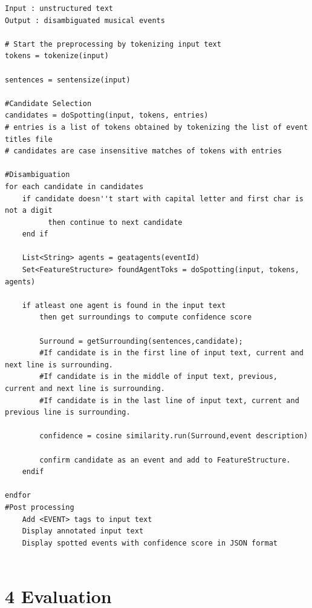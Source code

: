 \documentclass[a4paper,11pt]{report}
\begin{document}
\begin{lstlisting}[caption=This listing shows the pseudocode for EventSpotter.]
Input : unstructured text 
Output : disambiguated musical events

# Start the preprocessing by tokenizing input text
tokens = tokenize(input)

sentences = sentensize(input)

#Candidate Selection
candidates = doSpotting(input, tokens, entries)
# entries is a list of tokens obtained by tokenizing the list of event titles file
# candidates are case insensitive matches of tokens with entries

#Disambiguation
for each candidate in candidates
	if candidate doesn''t start with capital letter and first char is not a digit
          then continue to next candidate
	end if

    List<String> agents = geatagents(eventId)
	Set<FeatureStructure> foundAgentToks = doSpotting(input, tokens, agents)	
	
	if atleast one agent is found in the input text  
		then get surroundings to compute confidence score
			
		Surround = getSurrounding(sentences,candidate);
		#If candidate is in the first line of input text, current and next line is surrounding.
		#If candidate is in the middle of input text, previous, current and next line is surrounding.
		#If candidate is in the last line of input text, current and previous line is surrounding.
	
		confidence = cosine similarity.run(Surround,event description)
	 
		confirm candidate as an event and add to FeatureStructure.
	endif
	
endfor
#Post processing
	Add <EVENT> tags to input text 
	Display annotated input text 
	Display spotted events with confidence score in JSON format
	

\end{lstlisting}


\chapter*{4 Evaluation}
\end{document}
